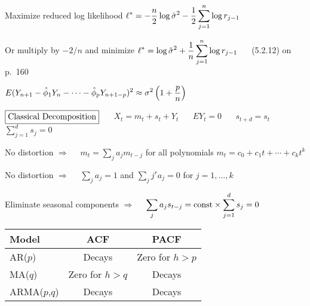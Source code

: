 \documentclass[12pt]{article}
\begin{document}
Maximize reduced log likelihood
$\displaystyle
\ell^*=-{n\over2}\log\hat\sigma^2-{1\over2}\sum_{j=1}^n\log r_{j-1}$

Or multiply by $-2/n$ and minimize
$\displaystyle
\ell^*=\log\hat\sigma^2+{1\over n}\sum_{j=1}^n\log r_{j-1}$
$\quad$
(5.2.12) on p.\ 160

$\displaystyle
E(Y_{n+1}-\hat\phi_1Y_n-\cdots-\hat\phi_pY_{n+1-p})^2\approx
\sigma^2\left(1+{p\over n}\right)$



$\boxed{\hbox{Classical Decomposition}}$
$\quad$
$X_t=m_t+s_t+Y_t$
$\quad$
$EY_t=0$
$\quad$
$s_{t+d}=s_t$
$\quad$
$\displaystyle
\sum_{j=1}^ds_j=0$

No distortion
$\Rightarrow\quad$
$\displaystyle
m_t=\sum_ja_jm_{t-j}$
for all polynomials
$m_t=c_0+c_1t+\cdots+c_kt^k$

No distortion
$\Rightarrow\quad$
$\displaystyle
\sum_ja_j=1$
and
$\displaystyle
\sum_jj^ra_j=0$
for $j=1,\ldots,k$

Eliminate seasonal components
$\Rightarrow\quad$
$\displaystyle
\sum_ja_js_{t-j}={\rm const}\times\sum_{j=1}^ds_j=0$



\begin{center}
\begin{tabular}{|l|c|c|}
\hline
Model & ACF & PACF\\
\hline
AR($p$) & Decays & Zero for $h>p$\\
MA($q$) & Zero for $h>q$ & Decays\\
ARMA($p$,$q$) & Decays & Decays\\
\hline
\end{tabular}
\end{center}
\end{document}
